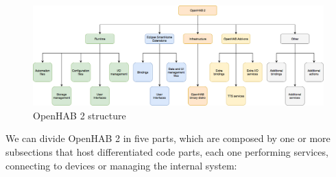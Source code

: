 \begin{figure}
	\centering
	\includegraphics[width=1\textwidth]{images/Chapter_05/openhab2-structure.png}
	\caption{OpenHAB 2 structure}
	\label{fig:openhab2-structure}
\end{figure}

We can divide OpenHAB 2 in five parts, which are composed by one or more subsections that host differentiated code parts, each one
performing services, connecting to devices or managing the internal system:

